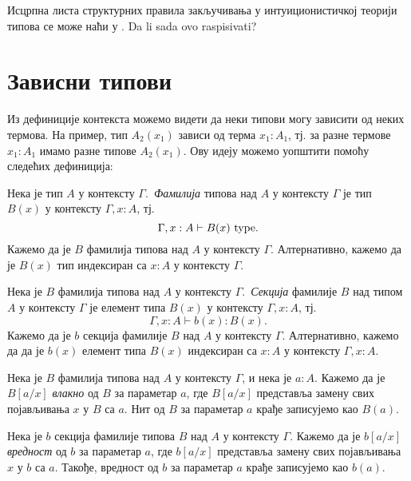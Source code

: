 \documentclass[12pt,oneside]{memoir}
\begin{document}
Исцрпна листа структурних правила закључивања у интуиционистичкој теорији типова се може наћи у \cite{rijke2022intro}. {\color{red}Da li sada ovo raspisivati?}

\section{Зависни типови}

Из дефиниције контекста можемо видети да неки типови могу зависити од неких термова. На пример, тип $A_2(x_1)$ зависи од терма $x_1 : A_1$, тј. за разне термове $x_1 : A_1$ имамо разне типове $A_2(x_1)$. Ову идеју можемо уопштити помоћу следећих дефиниција:

\begin{definition}
    Нека је тип $A$ у контексту $\Gamma$.~\emph{Фамилија} типова над $A$ у контексту $\Gamma$ је тип $B(x)$ у контексту $\Gamma, x : A$, тј.
    \[\Gamma, x : A \vdash B(x)~{\mathrm{type}}.\]
    Кажемо да је $B$ фамилија типова над $A$ у контексту $\Gamma$. Алтернативно, кажемо да је $B(x)$ тип индексиран са $x : A$ у контексту $\Gamma$.
\end{definition}

\begin{definition}
    Нека је $B$ фамилија типова над $A$ у контексту $\Gamma$.~\emph{Секција} фамилије $B$ над типом $A$ у контексту $\Gamma$ је елемент типа $B(x)$ у контексту $\Gamma, x : A$, тј.
    \[\Gamma, x : A \vdash b(x) : B(x).\]
    Кажемо да је $b$ секција фамилије $B$ над $A$ у контексту $\Gamma$. Алтернативно, кажемо да да је $b(x)$ елемент типа $B(x)$ индексиран са $x : A$ у контексту $\Gamma, x : A$. 
\end{definition}

\begin{definition}
    Нека је $B$ фамилија типова над $A$ у контексту $\Gamma$, и нека је $a : A$. Кажемо да је $B[a/x]$ \emph{влакно} од $B$ за параметар $a$, где $B[a/x]$ представља замену свих појављивања $x$ у $B$ са $a$. Нит од $B$ за параметар $a$ крађе записујемо као $B(a)$.
\end{definition}

\begin{definition}
    Нека је $b$ секција фамилије типова $B$ над $A$ у контексту $\Gamma$. Кажемо да је $b[a/x]$ \emph{вредност} од $b$ за параметар $a$, где $b[a/x]$ представља замену свих појављивања $x$ у $b$ са $a$. Такође, вредност од $b$ за параметар $a$ крађе записујемо као $b(a)$.
\end{definition}
\end{document}
